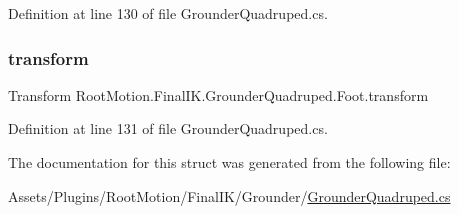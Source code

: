 Definition at line 130 of file Grounder\+Quadruped.\+cs.

\mbox{\label{struct_root_motion_1_1_final_i_k_1_1_grounder_quadruped_1_1_foot_ad5f539c65904358a36b45ca8fe512478}} 
\subsubsection{\texorpdfstring{transform}{transform}}
{\footnotesize\ttfamily Transform Root\+Motion.\+Final\+I\+K.\+Grounder\+Quadruped.\+Foot.\+transform}



Definition at line 131 of file Grounder\+Quadruped.\+cs.



The documentation for this struct was generated from the following file\+:\begin{DoxyCompactItemize}
\item 
Assets/\+Plugins/\+Root\+Motion/\+Final\+I\+K/\+Grounder/\mbox{\hyperlink{_grounder_quadruped_8cs}{Grounder\+Quadruped.\+cs}}\end{DoxyCompactItemize}
